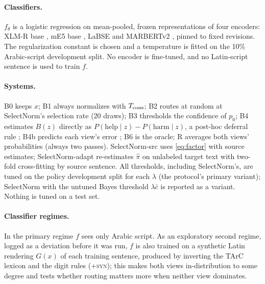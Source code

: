 \paragraph{Classifiers.}
$f_\theta$ is a logistic regression on mean-pooled, frozen representations of four encoders: XLM-R base \citep{conneau2020xlmr}, mE5 base \citep{wang2024me5}, LaBSE \citep{feng2022labse} and MARBERTv2 \citep{abdulmageed2021marbert}, pinned to fixed revisions. The regularization constant is chosen and a temperature is fitted \citep{guo2017calibration} on the 10\% Arabic-script development split. No encoder is fine-tuned, and no Latin-script sentence is used to train $f$.

\paragraph{Systems.}
B0 keeps $x$; B1 always normalizes with $T_{\rm cons}$; B2 routes at random at SelectNorm's selection rate (20 draws); B3 thresholds the confidence of $p_0$; B4 estimates $B(z)$ directly as $P(\text{help}\mid z)-P(\text{harm}\mid z)$, a post-hoc deferral rule \citep{jitkrittum2023cascade}; B4b predicts each view's error \citep{kim2020learningloss}; B6 is the oracle; R averages both views' probabilities (always two passes). SelectNorm-src uses \cref{eq:factor} with source estimates; SelectNorm-adapt re-estimates $\hat\pi$ on unlabeled target text with two-fold cross-fitting by source sentence. All thresholds, including SelectNorm's, are tuned on the policy development split for each $\lambda$ (the protocol's primary variant); SelectNorm with the untuned Bayes threshold $\lambda\bar c$ is reported as a variant. Nothing is tuned on a test set.

\paragraph{Classifier regimes.}
In the primary regime $f$ sees only Arabic script. As an exploratory second regime, logged as a deviation before it was run, $f$ is also trained on a synthetic Latin rendering $G(x)$ of each training sentence, produced by inverting the TArC lexicon and the digit rules (\textsc{+syn}); this makes both views in-distribution to some degree and tests whether routing matters more when neither view dominates.

